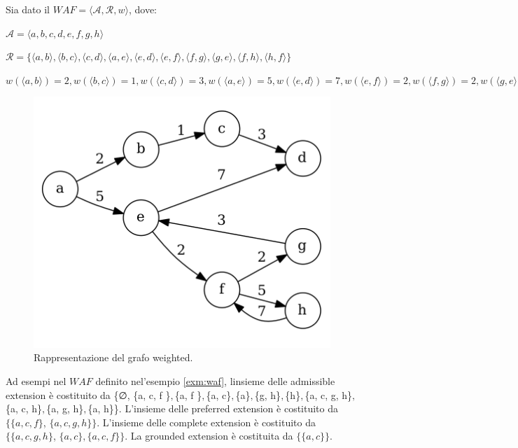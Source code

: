 \begin{exmp}
    Sia dato il $WAF  = ⟨\mathcal{A}, \mathcal{R}, w⟩$, dove:
    \begin{center}
        $\mathcal{A} = ⟨a, b, c, d, e, f, g, h⟩$
        
        $\mathcal{R} = \{⟨a, b⟩, ⟨b, c⟩, ⟨c, d⟩, ⟨a, e⟩, ⟨e, d⟩, ⟨e, f⟩, ⟨f, g⟩, ⟨g, e⟩, ⟨f, h⟩, ⟨h, f⟩\}$
        
        $w(⟨a, b⟩) = 2, w(⟨b, c⟩) = 1, w(⟨c, d⟩) = 3, w(⟨a, e⟩) = 5, w(⟨e, d⟩) = 7, w(⟨e, f⟩) = 2, w(⟨f, g⟩) = 2, w(⟨g, e⟩) = 3, w(⟨f, h⟩) = 5, w(⟨h, f⟩) = 7$
    \end{center}
    
    \begin{figure}[h]
      \includegraphics[width=\linewidth]{Immagini/example-waf-graph.png}
      \caption{Rappresentazione del grafo weighted.}
      \label{fig:baf-graph1}
    \end{figure}
    
    \label{exm:waf}
\end{exmp}

Ad esempi nel $WAF$ definito nel'esempio \ref{exm:waf}, linsieme delle admissible extension è costituito da \{∅, \{a, c, f \}$, $\{a, f \}$, $\{a, c\}$, $\{a\}$, $\{g, h\}$, $\{h\}$, $\{a, c, g, h\}$, $\{a, c, h\}$, $\{a, g, h\}$, $\{a, h\}\}. L'insieme delle preferred extension è costituito da $\{\{a, c, f\}$, $\{a, c, g, h\}\}$. L'insieme delle complete extension è costituito da $\{\{a, c, g, h\}$, $\{a, c\}, \{a, c, f\}\}$. La grounded extension è costituita da $\{\{a, c\}\}$.


